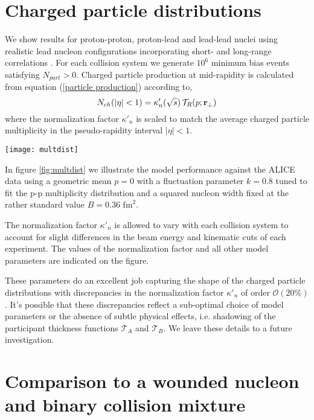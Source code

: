 \documentclass[aps,prl,reprint,amsmath,nofootinbib]{revtex4-1}
\begin{document}
\section{Charged particle distributions}

We show results for proton-proton, proton-lead and lead-lead nuclei using realistic lead nucleon configurations incorporating short- and long-range 
correlations \cite{nucleon-correlations}. For each collision system we generate $10^6$ minimum bias events satisfying $N_{part} > 0$. Charged particle
production at mid-rapidity is calculated from equation (\ref{particle production}) according to, 
\begin{equation}
 N_{ch}(|\eta|<1) = \kappa'_n(\sqrt{s})\, \mathcal{T}_R(p;{\bf r}_\perp)
\end{equation}
where the normalization factor $\kappa'_n$ is scaled to match the average charged particle multiplicity in the pseudo-rapidity interval $|\eta| < 1$.
\begin{figure*}[ht]
    \texttt{[image: multdist]}
    \caption{\label{fig:multdist}Multiplicity distributions.}
\end{figure*}

In figure \ref{fig:multdist} we illustrate the model performance against the ALICE data using a geometric mean $p=0$ with a fluctuation parameter $k=0.8$ tuned 
to fit the p-p multiplicity distribution and a squared nucleon width fixed at the rather standard value $B=0.36$ $\mbox{fm}^2$. 

The normalization factor $\kappa'_n$ is allowed to vary with each collision system to account for slight differences in the beam energy and kinematic cuts of 
each experiment. The values of the normalization factor and all other model parameters are indicated on the figure.

These parameters do an excellent job capturing the shape of the charged particle distributions with discrepancies in the normalization factor $\kappa'_n$ of
order $\mathcal{O}(20\%)$. It's possible that these discrepancies reflect a sub-optimal choice of model parameters or the absence of subtle physical effects, 
i.e. shadowing of the participant thickness functions $\mathcal{T}_A$ and $\mathcal{T}_B$. We leave these details to a future investigation.


\section{Comparison to a wounded nucleon and binary collision mixture}
\end{document}
